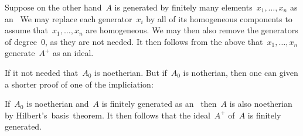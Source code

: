 Suppose on the other hand~$A$ is generated by finitely many elements~$x_1, \dotsc, x_n$ as an~
We may replace each generator~$x_i$ by all of its homogeneous components to assume that~$x_1, \dotsc, x_n$ are homogeneous.
We may then also remove the generators of degree~$0$, as they are not needed.
It then follows from the above  that~$x_1, \dotsc, x_n$ generate~$A^+$ as an ideal.

\begin{remark}
  If it not needed that~$A_0$ is noetherian.
  But if~$A_0$ is notherian, then one can given a shorter proof of one of the impliciation:
  
  If~$A_0$ is noetherian and~$A$ is finitely generated as an~ then~$A$ is also noetherian by Hilbert’s~basis~theorem.
  It then follows that the ideal~$A^+$ of~$A$ is finitely generated.
\end{remark}




